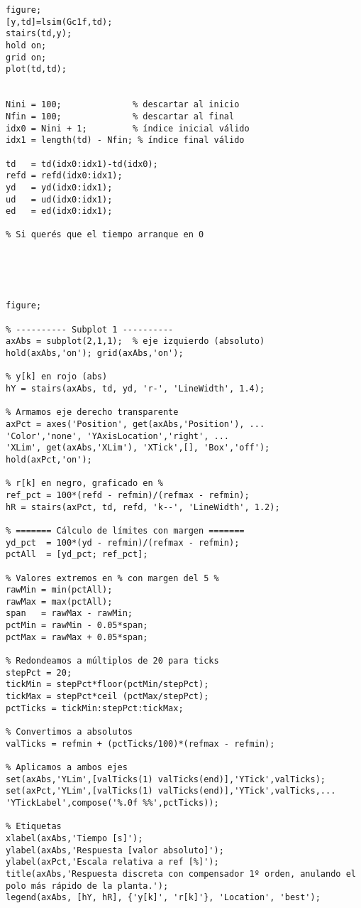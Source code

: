 \begin{lstlisting}[style=matlabstyle,caption={Hoja cálculos utilizada para el diseño de los compensadores.},label={matlab:hojaDeCalculos}]
figure;
[y,td]=lsim(Gc1f,td);
stairs(td,y);
hold on;
grid on;
plot(td,td);


Nini = 100;              % descartar al inicio
Nfin = 100;              % descartar al final
idx0 = Nini + 1;         % índice inicial válido
idx1 = length(td) - Nfin; % índice final válido

td   = td(idx0:idx1)-td(idx0);
refd = refd(idx0:idx1);
yd   = yd(idx0:idx1);
ud   = ud(idx0:idx1);
ed   = ed(idx0:idx1);

% Si querés que el tiempo arranque en 0





figure;

% ---------- Subplot 1 ----------
axAbs = subplot(2,1,1);  % eje izquierdo (absoluto)
hold(axAbs,'on'); grid(axAbs,'on');

% y[k] en rojo (abs)
hY = stairs(axAbs, td, yd, 'r-', 'LineWidth', 1.4);

% Armamos eje derecho transparente
axPct = axes('Position', get(axAbs,'Position'), ...
'Color','none', 'YAxisLocation','right', ...
'XLim', get(axAbs,'XLim'), 'XTick',[], 'Box','off');
hold(axPct,'on');

% r[k] en negro, graficado en %
ref_pct = 100*(refd - refmin)/(refmax - refmin);
hR = stairs(axPct, td, refd, 'k--', 'LineWidth', 1.2);

% ======= Cálculo de límites con margen =======
yd_pct  = 100*(yd - refmin)/(refmax - refmin);
pctAll  = [yd_pct; ref_pct];

% Valores extremos en % con margen del 5 %
rawMin = min(pctAll);
rawMax = max(pctAll);
span   = rawMax - rawMin;
pctMin = rawMin - 0.05*span;
pctMax = rawMax + 0.05*span;

% Redondeamos a múltiplos de 20 para ticks
stepPct = 20;
tickMin = stepPct*floor(pctMin/stepPct);
tickMax = stepPct*ceil (pctMax/stepPct);
pctTicks = tickMin:stepPct:tickMax;

% Convertimos a absolutos
valTicks = refmin + (pctTicks/100)*(refmax - refmin);

% Aplicamos a ambos ejes
set(axAbs,'YLim',[valTicks(1) valTicks(end)],'YTick',valTicks);
set(axPct,'YLim',[valTicks(1) valTicks(end)],'YTick',valTicks,...
'YTickLabel',compose('%.0f %%',pctTicks));

% Etiquetas
xlabel(axAbs,'Tiempo [s]');
ylabel(axAbs,'Respuesta [valor absoluto]');
ylabel(axPct,'Escala relativa a ref [%]');
title(axAbs,'Respuesta discreta con compensador 1º orden, anulando el polo más rápido de la planta.');
legend(axAbs, [hY, hR], {'y[k]', 'r[k]'}, 'Location', 'best');


\end{lstlisting}
